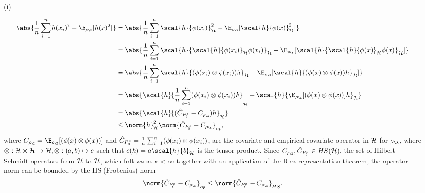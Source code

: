 \begin{description}
\item[{(i)}] 
\end{description}
\begin{align*}
  \abs{\frac{1}{n} \sum_{i=1}^nh(x_i)^2 - \E_{\rho_{\X}}[h(x)^2]} & = \abs{\frac{1}{n} \sum_{i=1}^n \scal{h}{\phi(x_i)}_{\rkhs{H}}^2  - \E_{\rho_{\X}}[\scal{ h}{ \phi(x) }_{\rkhs{H}}^2]} \\
                                                                  & = \abs{\frac{1}{n} \sum_{i=1}^n \scal{h}{\scal{h}{\phi(x_i)}_{\rkhs{H}} \phi(x_i)}_{\rkhs{H}}  - \E_{\rho_{\X}}[\scal{h}{\scal{h}{\phi(x)}_{\rkhs{H}}\phi(x)}_{\rkhs{H}}]} \\
                                                                  & = \abs{\frac{1}{n} \sum_{i=1}^n \scal{h}{(\phi(x_i) \otimes \phi(x_i)) h}_{\rkhs{H}} - \E_{\rho_{\X}}[\scal{h}{(\phi(x) \otimes \phi(x)) h}_{\rkhs{H}}]} \\
                                                                  & = \abs{\scal{h}{\frac{1}{n} \sum_{i=1}^n(\phi(x_i) \otimes \phi(x_i)) h}_{\rkhs{H}} - \scal{h}{\E_{\rho_{\X}}[(\phi(x) \otimes \phi(x))] h}_{\rkhs{H}}} \\
                                                                  & = \abs{\scal{h}{(\hat{C}_{\poolsetx_{0}} - C_{\rho_{\X}})h}_{\rkhs{H}}} \\
                                                                  & \leq \norm{h}_{\rkhs{H}}^2 \norm{\hat{C}_{\poolsetx_{0}} - C_{\rho_{\X}}}_{op},
\end{align*}         
where \(C_{\rho_{\X}} = \E_{\rho_{\X}}[(\phi(x) \otimes \phi(x))]\) and
\(\hat{C}_{P^x_{0}} = \frac{1}{n} \sum_{i=1}^n(\phi(x_i) \otimes
\phi(x_i))\), are the covariate and empirical covariate operator in \(\mathcal{H}\)
for \(\rho_{\X}\), where \(\otimes: \mathcal{H} \times \mathcal{H} \to \mathcal{H},
\otimes: (a, b) \mapsto c\) such that \(c(h) = a\scal{h}{b}_{\rkhs{H}}\) is the
tensor product. Since \(C_{\rho_{\X}}, \hat{C}_{\poolsetx_{0}} \in
HS(\rkhs{H})\), the set of Hilbert-Schmidt operators from \(\mathcal{H}\) to
\(\mathcal{H}\), which follows as \(\kappa < \infty\) together with an application
of the Riez representation theorem, the operator norm can be bounded by the HS
(Frobenius) norm
\begin{equation}
  \label{eq:op_leq_HS} \norm{\hat{C}_{\poolsetx_{0}} - C_{\rho_{\X}}}_{op} \leq
\norm{\hat{C}_{\poolsetx_{0}} - C_{\rho_{\X}}}_{HS}.
\end{equation}


